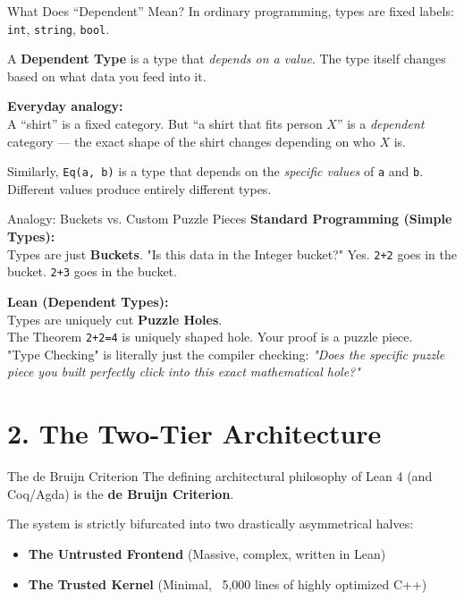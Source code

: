 \documentclass[10pt,aspectratio=169]{beamer}
\begin{document}
\begin{frame}[fragile]{What Does ``Dependent'' Mean?}
    In ordinary programming, types are fixed labels: \verb|int|, \verb|string|, \verb|bool|.
    
    \vspace{1em}
    A \textbf{Dependent Type} is a type that \textit{depends on a value}. The type itself changes based on what data you feed into it.
    
    \vspace{1em}
    \textbf{Everyday analogy:} \\
    A ``shirt'' is a fixed category. But ``a shirt that fits person $X$'' is a \textit{dependent} category — the exact shape of the shirt changes depending on who $X$ is.
    
    \vspace{1em}
    Similarly, \verb|Eq(a, b)| is a type that depends on the \textit{specific values} of \verb|a| and \verb|b|. Different values produce entirely different types.
\end{frame}

\begin{frame}[fragile]{Analogy: Buckets vs. Custom Puzzle Pieces}
    \textbf{Standard Programming (Simple Types):} \\
    Types are just \textbf{Buckets}. "Is this data in the Integer bucket?" Yes. \verb|2+2| goes in the bucket. \verb|2+3| goes in the bucket.
    
    \vspace{1em}
    \textbf{Lean (Dependent Types):} \\
    Types are uniquely cut \textbf{Puzzle Holes}. \\
    The Theorem \verb|2+2=4| is uniquely shaped hole. Your proof is a puzzle piece. \\
    "Type Checking" is literally just the compiler checking: \textit{"Does the specific puzzle piece you built perfectly click into this exact mathematical hole?"}
\end{frame}

\section{2. The Two-Tier Architecture}

\begin{frame}[fragile]{The de Bruijn Criterion}
    The defining architectural philosophy of Lean 4 (and Coq/Agda) is the \textbf{de Bruijn Criterion}.
    
    The system is strictly bifurcated into two drastically asymmetrical halves:
    \begin{itemize}
        \item \textbf{The Untrusted Frontend} (Massive, complex, written in Lean)
        \item \textbf{The Trusted Kernel} (Minimal, ~5,000 lines of highly optimized C++)
    \end{itemize}
\end{frame}
\end{document}

